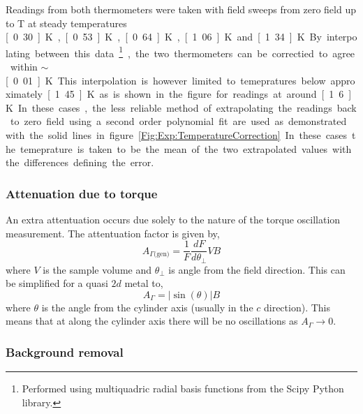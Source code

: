 Readings from both thermometers were taken with field sweeps from zero field up to \unit[18]{T} at steady temperatures \unit[0.30]{K}, \unit[0.53]{K}, \unit[0.64]{K}, \unit[1.06]{K} and \unit[1.34]{K}. By interpolating between this data\footnote{Performed using multiquadric radial basis functions from the Scipy Python library.}, the two thermometers can be correctied to agree within $\sim$\unit[0.01]{K}. This interpolation is however limited to temepratures below approximately \unit[1.45]{K} as is shown in the figure for readings at around \unit[1.6]{K}. In these cases, the less reliable method of extrapolating the readings back to zero field using a second order polynomial fit are used as demonstrated with the solid lines in figure~\ref{Fig:Exp:TemperatureCorrection}. In these cases the temeprature is taken to be the mean of the two extrapolated values with the differences defining the error.


\subsubsection{Attenuation due to torque}

An extra attentuation occurs due solely to the nature of the torque oscillation measurement. The attentuation factor is given by,
\begin{equation}
    A_{\Gamma \textrm{(gen)}} = \frac{1}{F}\frac{dF}{d\theta_\perp}VB
\end{equation}
where $V$ is the sample volume and $\theta_\perp$ is angle from the field direction. This can be simplified for a quasi $2d$ metal to,
\begin{equation}
    A_{\Gamma} = |\sin(\theta)|B
\end{equation}
where $\theta$ is the angle from the cylinder axis (usually in the $c$ direction). This means that at along the cylinder axis there will be no oscillations as $A_{\Gamma} \to 0$.


\subsubsection{Background removal}

